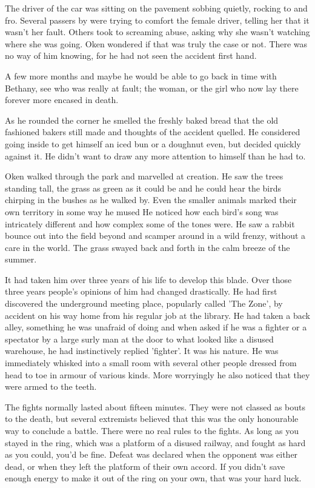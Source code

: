The driver of the car was sitting on the pavement sobbing quietly, rocking to and fro.  Several passers by were trying to comfort the female driver, telling her that it wasn't her fault.  Others took to screaming abuse, asking why she wasn't watching where she was going.  Oken wondered if that was truly the case or not.  There was no way of him knowing, for he had not seen the accident first hand.  

A few more months and maybe he would be able to go back in time with Bethany, see who was really at fault; the woman, or the girl who now lay there forever more encased in death.

As he rounded the corner he smelled the freshly baked bread that the old fashioned bakers still made and thoughts of the accident quelled.  He considered going inside to get himself an iced bun or a doughnut even, but decided quickly against it.  He didn't want to draw any more attention to himself than he had to.

Oken walked through the park and marvelled at creation.  He saw the trees standing tall, the grass as green as it could be and he could hear the birds chirping in the bushes as he walked by.  Even the smaller animals marked their own territory in some way he mused  He noticed how each bird's song was intricately different and how complex some of the tones were.  He saw a rabbit bounce out into the field beyond and scamper around in a wild frenzy, without a care in the world.  The grass swayed back and forth in the calm breeze of the summer.  

It had taken him over three years of his life to develop this blade.  Over those three years people's opinions of him had changed drastically.  He had first discovered the underground meeting place, popularly called 'The Zone', by accident on his way home from his regular job at the library.  He had taken a back alley, something he was unafraid of doing and when asked if he was a fighter or a spectator by a large surly man at the door to what looked like a disused warehouse, he had instinctively replied 'fighter'.  It was his nature.  He was immediately whisked into a small room with several other people dressed from head to toe in armour of various kinds.  More worryingly he also noticed that they were armed to the teeth. 

The fights normally lasted about fifteen minutes.  They were not classed as bouts to the death, but several extremists believed that this was the only honourable way to conclude a battle.  There were no real rules to the fights.  As long as you stayed in the ring, which was a platform of a disused railway, and fought as hard as you could, you'd be fine.  Defeat was declared when the opponent was either dead, or when they left the platform of their own accord.  If you didn't save enough energy to make it out of the ring on your own, that was your hard luck.  

